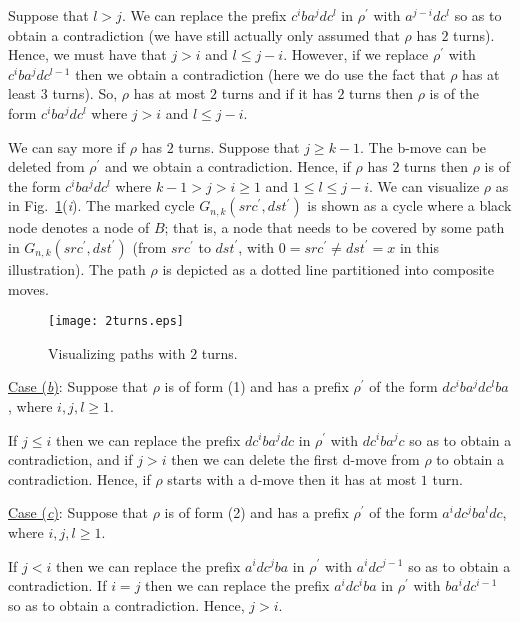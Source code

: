 \documentclass{article}
\newcounter{fig}
\begin{document}
Suppose that $l > j$. We can replace the prefix $c^iba^jdc^l$ in $\rho^\prime$ with $a^{j-i}dc^l$ so as to obtain a contradiction (we have still actually only assumed that $\rho$ has $2$ turns). Hence, we must have that $j >i$ and $l \leq j-i$. However, if we replace $\rho^\prime$ with $c^iba^jdc^{l-1}$ then we obtain a contradiction (here we do use the fact that $\rho$ has at least $3$ turns). So, $\rho$ has at most $2$ turns and if it has $2$ turns then $\rho$ is of the form $c^iba^jdc^l$ where $j >i$ and $l \leq j-i$.

We can say more if $\rho$ has $2$ turns. Suppose that $j\geq k-1$. The b-move can be deleted from $\rho^\prime$ and we obtain a contradiction. Hence, if $\rho$ has $2$ turns then $\rho$ is of the form $c^iba^jdc^l$ where $k-1 > j >i\geq 1$ and $1\leq l \leq j-i$. We can visualize $\rho$ as in Fig.~\ref{2turns}(\emph{i\/}). The marked cycle $G_{n,k}(src^\prime,dst^\prime)$ is shown as a cycle where a black node denotes a node of $B$; that is, a node that needs to be covered by some path in $G_{n,k}(src^\prime,dst^\prime)$ (from $src^\prime$ to $dst^\prime$, with $0=src^\prime\neq dst^\prime=x$ in this illustration). The path $\rho$ is depicted as a dotted line partitioned into composite moves.\smallskip

\begin{figure}[t]
\centering
\texttt{[image: 2turns.eps]}
\caption{Visualizing paths with $2$ turns.}\label{2turns}
\end{figure}

\noindent\underline{Case (\emph{b\/})}: Suppose that $\rho$ is of form (1) and has a prefix $\rho^\prime$ of the form $dc^iba^jdc^lba$, where $i,j,l\geq 1$.\smallskip

\noindent If $j \leq i$ then we can replace the prefix $dc^iba^jdc$ in $\rho^\prime$ with $dc^iba^jc$ so as to obtain a contradiction, and if $j > i$ then we can delete the first d-move from $\rho$ to obtain a contradiction. Hence, if $\rho$ starts with a d-move then it has at most $1$ turn.\smallskip

\noindent\underline{Case (\emph{c\/})}: Suppose that $\rho$ is of form (2) and has a prefix $\rho^\prime$ of the form $a^idc^jba^ldc$, where $i,j,l\geq 1$.\smallskip

\noindent If $j< i$ then we can replace the prefix $a^idc^jba$ in $\rho^\prime$ with $a^idc^{j-1}$ so as to obtain a contradiction. If $i=j$ then we can replace the prefix $a^idc^iba$ in $\rho^\prime$ with $ba^idc^{i-1}$ so as to obtain a contradiction. Hence, $j > i$. 
\end{document}
